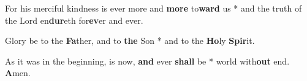 \begin{multicols}{2}
	For his merciful kindness is ever more and \textbf{more} to\textbf{ward} us * and the truth of the Lord en\textbf{dur}eth for\textbf{ev}er and ever.
	
	Glory be to the \textbf{Fa}ther, and to \textbf{the} Son * and to the \textbf{Ho}ly \textbf{Spir}it.
	
	As it was in the beginning, is now, \textbf{and} ever \textbf{shall} be * world with\textbf{out} end. \textbf{A}men.
\end{multicols}